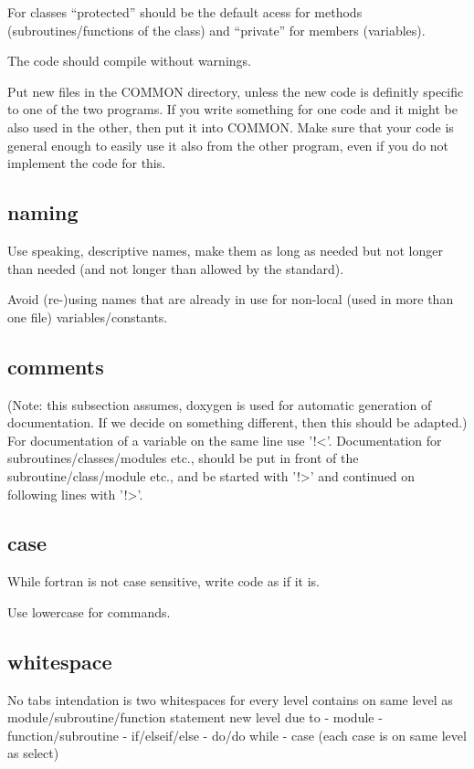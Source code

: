 \documentclass{article}
\begin{document}
For classes ``protected'' should be the default acess for methods
(subroutines/functions of the class) and ``private'' for members
(variables).

The code should compile without warnings.

Put new files in the COMMON directory, unless the new code is definitly
specific to one of the two programs.
If you write something for one code and it might be also used in the
other, then put it into COMMON. Make sure that your code is general
enough to easily use it also from the other program, even if you do not
implement the code for this.

\subsection{naming}
Use speaking, descriptive names, make them as long as needed but not
longer than needed (and not longer than allowed by the standard).

Avoid (re-)using names that are already in use for non-local (used in
more than one file) variables/constants.

\subsection{comments}
(Note: this subsection assumes, doxygen is used for automatic generation
of documentation. If we decide on something different, then this should
be adapted.)\\
For documentation of a variable on the same line use '!<'.
Documentation for subroutines/classes/modules etc., should be put in
front of the subroutine/class/module etc., and be started with '!>' and
continued on following lines with '!>'.

\subsection{case}
While fortran is not case sensitive, write code as if it is.

Use lowercase for commands.

\subsection{whitespace}
No tabs
intendation is two whitespaces for every level
contains on same level as module/subroutine/function statement
new level due to
- module
- function/subroutine
- if/elseif/else
- do/do while
- case (each case is on same level as select)
\end{document}
